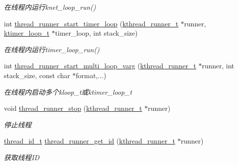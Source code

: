 \begin{DoxyCompactItemize}
\begin{DoxyCompactList}\small\item\em 在线程内运行knet\+\_\+loop\+\_\+run() \end{DoxyCompactList}\item 
int \hyperlink{a00112_ga943c1e0bc78abe3d7faae24ae3670d9a_ga943c1e0bc78abe3d7faae24ae3670d9a}{thread\+\_\+runner\+\_\+start\+\_\+timer\+\_\+loop} (\hyperlink{a00053_a4f78c259c9527c821f1a6f87495dd339_a4f78c259c9527c821f1a6f87495dd339}{kthread\+\_\+runner\+\_\+t} $\ast$runner, \hyperlink{a00053_a024af2aa29615e7a811ea6c45438157d_a024af2aa29615e7a811ea6c45438157d}{ktimer\+\_\+loop\+\_\+t} $\ast$timer\+\_\+loop, int stack\+\_\+size)
\begin{DoxyCompactList}\small\item\em 在线程内运行timer\+\_\+loop\+\_\+run() \end{DoxyCompactList}\item 
int \hyperlink{a00112_ga80fabbe64d1fc33e81053e51f69772d2_ga80fabbe64d1fc33e81053e51f69772d2}{thread\+\_\+runner\+\_\+start\+\_\+multi\+\_\+loop\+\_\+varg} (\hyperlink{a00053_a4f78c259c9527c821f1a6f87495dd339_a4f78c259c9527c821f1a6f87495dd339}{kthread\+\_\+runner\+\_\+t} $\ast$runner, int stack\+\_\+size, const char $\ast$format,...)
\begin{DoxyCompactList}\small\item\em 在线程内启动多个kloop\+\_\+t或ktimer\+\_\+loop\+\_\+t \end{DoxyCompactList}\item 
void \hyperlink{a00112_gac8644b2d2ca5580e0cac7378154ae2e0_gac8644b2d2ca5580e0cac7378154ae2e0}{thread\+\_\+runner\+\_\+stop} (\hyperlink{a00053_a4f78c259c9527c821f1a6f87495dd339_a4f78c259c9527c821f1a6f87495dd339}{kthread\+\_\+runner\+\_\+t} $\ast$runner)
\begin{DoxyCompactList}\small\item\em 停止线程 \end{DoxyCompactList}\item 
\hyperlink{a00053_ad0ada5642d10ce71bdd90816182f9b79_ad0ada5642d10ce71bdd90816182f9b79}{thread\+\_\+id\+\_\+t} \hyperlink{a00112_ga1f1e994ba4c42e91e4d4b120aa8eb970_ga1f1e994ba4c42e91e4d4b120aa8eb970}{thread\+\_\+runner\+\_\+get\+\_\+id} (\hyperlink{a00053_a4f78c259c9527c821f1a6f87495dd339_a4f78c259c9527c821f1a6f87495dd339}{kthread\+\_\+runner\+\_\+t} $\ast$runner)
\begin{DoxyCompactList}\small\item\em 获取线程\+I\+D \end{DoxyCompactList}\item 

\end{DoxyCompactItemize}
